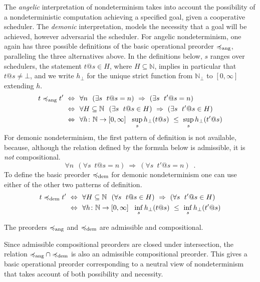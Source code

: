 The  \emph{angelic} interpretation of nondeterminism takes into account the possibility of a nondeterministic computation achieving a specified goal, given a cooperative scheduler.  The  \emph{demonic} interpretation, 
models the {necessity} that a goal will be achieved, however adversarial the scheduler. 
For angelic nondeterminism, one again has three possible definitions of the basic operational preorder
$\preccurlyeq_{\text{ang}}$, paralleling the three alternatives above. In the definitions below, $s$ ranges over schedulers, the statement $t@s \in H$, where $H \subseteq \mathbb{N}$, implies in particular that $t@s \neq\bot$, and we write $h_\bot$ for the unique strict function from $\mathbb{N}_\bot$ to
$[0,\infty]$ extending $h$.
\begin{align*}
t \preccurlyeq_{\text{ang}} t' ~ \Leftrightarrow ~ ~& \forall n ~~ (\exists s ~\; t@s =n)~ \Rightarrow~ (\exists s ~ \; t'@s =n) 
\\
~ \Leftrightarrow ~ ~& \forall H \subseteq \mathbb{N}~~ (\exists s ~\; t@s \in H)~ \Rightarrow~ (\exists s ~ \; t'@s \in H) 
\\
~ \Leftrightarrow ~ ~& \forall h\colon \mathbb{N}\to [0,\infty]~~ \sup_s h_\bot(t@s)~ \leq ~ \sup_s h_\bot(t'@s)
\end{align*}
For demonic nondeterminism, the first pattern of definition is not available, because, although  the relation defined by the formula below is admissible, it is  \emph{not} compositional.
\[
\forall n ~~ (\forall s ~\; t@s =n)~ \Rightarrow~ (\forall s ~ \; t'@s =n) \enspace .
\]
To define the basic preorder $\preccurlyeq_{\text{dem}}$ for demonic nondeterminism one can use either of the other two patterns of definition.
\begin{align*}
t \preccurlyeq_{\text{dem}} t' ~ \Leftrightarrow ~ ~& \forall H \subseteq \mathbb{N}~~ (\forall s ~ \; t@s \in H)~ \Rightarrow~ (\forall s ~ \; t'@s \in H) 
\\
~ \Leftrightarrow ~ ~& \forall h\colon \mathbb{N}\to [0,\infty]~~ \inf_s  h_\bot(t@s)~ \leq ~ \inf_s h_\bot(t'@s)
\end{align*}
\begin{aproposition}
The preorders $\preccurlyeq_{\text{ang}}$  and $\preccurlyeq_{\text{dem}}$ are admissible and compositional. 
\end{aproposition}
\noindent
Since admissible compositional preorders are closed under intersection, the relation ${\preccurlyeq_{\text{ang}}} \cap {\preccurlyeq_{\text{dem}}}$ is also an admissible compositional preorder. This gives a basic operational preorder corresponding to a neutral view of nondeterminism that takes account of both possibility and necessity.

